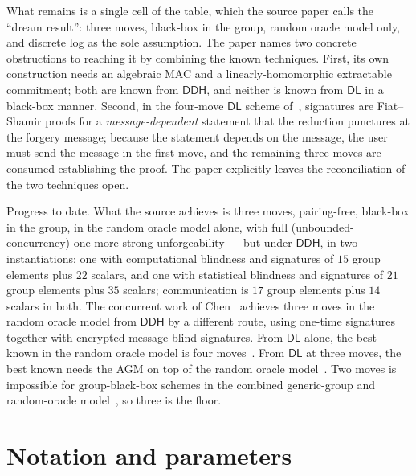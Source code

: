 \documentclass{aicr-conjecture}
\newcommand{\DL}{\mathsf{DL}}
\newcommand{\DDH}{\mathsf{DDH}}
\begin{document}
What remains is a single cell of the table, which the source paper calls
the ``dream result'': three moves, black-box in the group, random oracle
model only, and discrete log as the sole assumption. The paper names two
concrete obstructions to reaching it by combining the known techniques.
First, its own construction needs an algebraic MAC and a
linearly-homomorphic extractable commitment; both are known from $\DDH$,
and neither is known from $\DL$ in a black-box manner. Second, in the
four-move $\DL$ scheme of~\cite{KLR25}, signatures are Fiat--Shamir proofs
for a \emph{message-dependent} statement that the reduction punctures at
the forgery message; because the statement depends on the message, the
user must send the message in the first move, and the remaining three
moves are consumed establishing the proof. The paper explicitly leaves the
reconciliation of the two techniques open.

Progress to date. What the source achieves is three moves, pairing-free,
black-box in the group, in the random oracle model alone, with full
(unbounded-concurrency) one-more strong unforgeability --- but under
$\DDH$, in two instantiations: one with computational blindness and
signatures of $15$ group elements plus $22$ scalars, and one with
statistical blindness and signatures of $21$ group elements plus $35$
scalars; communication is $17$ group elements plus $14$ scalars in both.
The concurrent work of Chen~\cite{Che26} achieves three moves in the
random oracle model from $\DDH$ by a different route, using one-time
signatures together with encrypted-message blind signatures. From $\DL$
alone, the best known in the random oracle model is four
moves~\cite{KLR25}. From $\DL$ at three moves, the best known needs the
AGM on top of the random oracle model~\cite{Abe01,TZ22}. Two moves is
impossible for group-black-box schemes in the combined generic-group and
random-oracle model~\cite{DKT26}, so three is the floor.

\section{Notation and parameters}\label{sec:notation}
\end{document}
